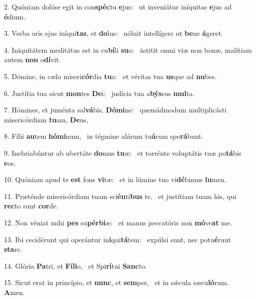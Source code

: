 2. Quóniam dolóse egit in con\textbf{spéc}tu \textbf{e}jus: \ast\  ut inveniátur iníquitas \textbf{e}jus ad \textbf{ó}dium.\

3. Verba oris ejus iníqui\textbf{tas}, et \textbf{do}lus: \ast\  nóluit intellígere ut \textbf{be}ne \textbf{á}geret.\

4. Iniquitátem meditátus est in cu\textbf{bí}li \textbf{su}o: \ast\  ástitit omni viæ non bonæ, malítiam autem \textbf{non} o\textbf{dí}vit.\

5. Dómine, in cælo miseri\textbf{cór}dia \textbf{tu}a: \ast\  et véritas tua \textbf{us}que ad \textbf{nu}bes.\

6. Justítia tua sicut \textbf{mon}tes \textbf{De}i: \ast\  judícia tua a\textbf{býs}sus \textbf{mul}ta.\

7. Hómines, et juménta sal\textbf{vá}bis, \textbf{Dó}\textbf{mi}ne: \ast\  quemádmodum multiplicásti misericórdiam \textbf{tu}am, \textbf{De}us,\

8. Fílii \textbf{au}tem \textbf{hó}\textbf{mi}num, \ast\  in tégmine alárum tu\textbf{á}rum spe\textbf{rá}bunt.\

9. Inebriabúntur ab ubertáte \textbf{do}mus \textbf{tu}æ: \ast\  et torrénte voluptátis tuæ po\textbf{tá}bis \textbf{e}os.\

10. Quóniam apud te \textbf{est} fons \textbf{vi}tæ: \ast\  et in lúmine tuo vi\textbf{dé}bimus \textbf{lu}men.\

11. Præténde misericórdiam tuam sci\textbf{én}ti\textbf{bus} te, \ast\  et justítiam tuam his, qui \textbf{rec}to sunt \textbf{cor}de.\

12. Non véniat mihi \textbf{pes} su\textbf{pér}\textbf{bi}æ: \ast\  et manus peccatóris non \textbf{mó}ve\textbf{at} me.\

13. Ibi cecidérunt qui operántur in\textbf{i}qui\textbf{tá}tem: \ast\  expúlsi sunt, nec potu\textbf{é}runt \textbf{sta}re.\

14. Glória \textbf{Pa}tri, et \textbf{Fí}\textbf{li}o, \ast\  et Spi\textbf{rí}tui \textbf{Sanc}to.\

15. Sicut erat in princípio, et \textbf{nunc}, et \textbf{sem}per, \ast\  et in sǽcula sæcu\textbf{ló}rum. \textbf{A}men.\

